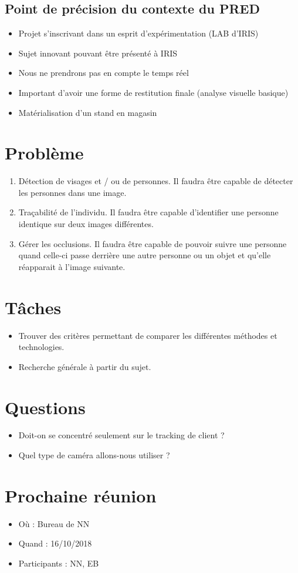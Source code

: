 \documentclass[11pt]{report}
\begin{document}
	\subsection{Point de précision du contexte du PRED}
		\begin{itemize}
		\item Projet s’inscrivant dans un esprit d’expérimentation (LAB d’IRIS)
		\item Sujet innovant pouvant être présenté à IRIS
		\item Nous ne prendrons pas en compte le temps réel
		\item Important d’avoir une forme de restitution finale (analyse visuelle basique)
		\item Matérialisation d’un stand en magasin
		\end{itemize}

\section{Problème}
	\begin{enumerate}
		\item Détection de visages et / ou de personnes. Il faudra être capable de détecter les personnes dans une image.\\
		\item Traçabilité de l'individu. Il faudra être capable d'identifier une personne identique sur deux images différentes.\\
		\item Gérer les occlusions. Il faudra être capable de pouvoir suivre une personne quand celle-ci passe derrière une autre personne ou un objet et qu'elle réapparait à l'image suivante.
	\end{enumerate}

\section{Tâches}
	\begin{itemize}
		\item Trouver des critères permettant de comparer les différentes méthodes
et technologies.
		\item Recherche générale à partir du sujet.
	\end{itemize}

\section{Questions}
	\begin{itemize}
		\item Doit-on se concentré seulement sur le tracking de client ?
		\item Quel type de caméra allons-nous utiliser ?
	\end{itemize}
		
\section{Prochaine réunion}
	\begin{itemize}
		\item Où : Bureau de NN
		\item Quand : 16/10/2018
		\item Participants : NN, EB
	\end{itemize}
\end{document}
